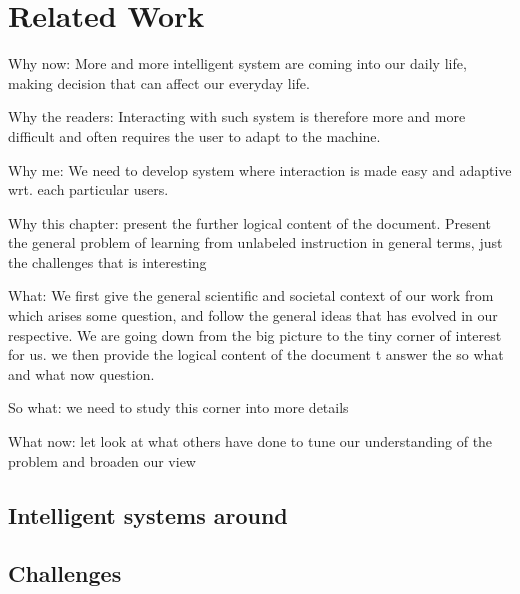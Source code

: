 \renewcommand{\chapterpath}{chapter2}
\renewcommand{\imgpath}{\chapterpath/img}

\chapter{Related Work}
\label{chapter:Introduction}
\minitoc

Why now: More and more intelligent system are coming into our daily life, making decision that can affect our everyday life. 

Why the readers: Interacting with such system is therefore more and more difficult and often requires the user to adapt to the machine.

Why me: We need to develop system where interaction is made easy and adaptive wrt. each particular users. 

Why this chapter: present the further logical content of the document. Present the general problem of learning from unlabeled instruction in general terms, just the challenges that is interesting 

What: We first give the general scientific and societal context of our work from which arises some question, and follow the general ideas that has evolved in our respective. We are going down from the big picture to the tiny corner of interest for us. we then provide the logical content of the document t answer the so what and what now question.

So what: we need to study this corner into more details

What now: let look at what others have done to tune our understanding of the problem and broaden our view

\section{Intelligent systems around}


\section{Challenges}

